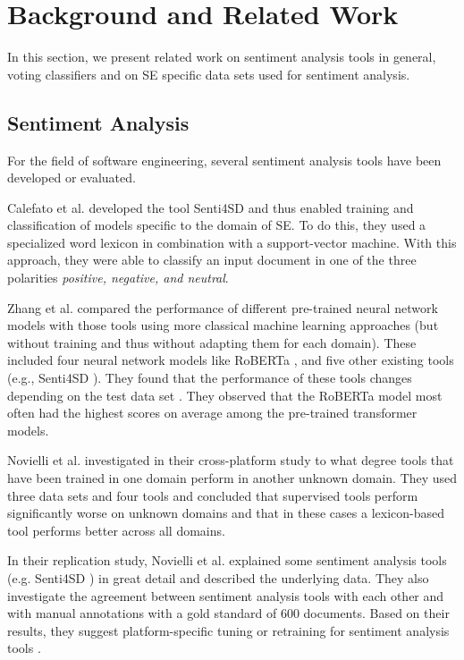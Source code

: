 \section{Background and Related Work}
\label{sec:background}

In this section, we present related work on sentiment analysis tools in general, voting classifiers and on SE specific data sets used for sentiment analysis.

\subsection{Sentiment Analysis}

For the field of software engineering, several sentiment analysis tools have been developed or evaluated.


Calefato et al. \cite{Calefato.2018} developed the tool Senti4SD and thus enabled training and classification of models specific to the domain of SE. To do this, they used a specialized word lexicon in combination with a support-vector machine. With this approach, they were able to classify an input document in one of the three polarities \textit{positive, negative, and neutral}.

Zhang et al. \cite{9240704} compared the performance of different pre-trained neural network models with those tools using more classical machine learning approaches (but without training and thus without adapting them for each domain). These included four neural network models like RoBERTa \cite{liu2019roberta}, and five other existing tools (e.g., Senti4SD \cite{Calefato.2018}). They found that the performance of these tools changes depending on the test data set \cite{9240704}. They observed that the RoBERTa model \cite{liu2019roberta} most often had the highest scores on average among the pre-trained transformer models.

Novielli et al. \cite{noviellicross20} investigated in their cross-platform study to what degree tools that have been trained in one domain perform in another unknown domain. They used three data sets and four tools and concluded that supervised tools perform significantly worse on unknown domains and that in these cases a lexicon-based tool performs better across all domains.

In their replication study, Novielli et al. \cite{Novielli.replication2021} explained some sentiment analysis tools (e.g. Senti4SD \cite{Calefato.2018}) in great detail and described the underlying data. They also investigate the agreement between sentiment analysis tools with each other and with manual annotations with a gold standard of 600 documents. Based on their results, they suggest platform-specific tuning or retraining for sentiment analysis tools \cite{Novielli.replication2021}.

